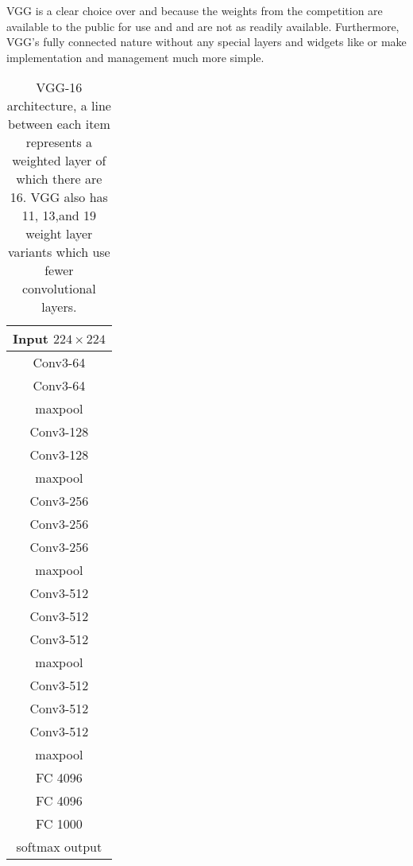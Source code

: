 VGG is a clear choice over \gnet and \anet because the weights from the competition are available to the public for use and \anet and \gnet are not as readily available. Furthermore, VGG's fully connected nature without any special layers and widgets like \anet or \gnet make implementation and management much more simple. %

\begin{table}
    \begin{center}
        \begin{tabular}{| c |}
        \hline
        Input $224 \times 224$ \\
        \hline
        Conv3-64 \\
        Conv3-64 \\
        \hline
        maxpool\\
        \hline
        Conv3-128 \\
        Conv3-128 \\
        \hline
        maxpool \\
        \hline
        Conv3-256 \\
        Conv3-256 \\
        Conv3-256 \\
        \hline
        maxpool \\
        \hline
        Conv3-512 \\
        Conv3-512 \\
        Conv3-512 \\
        \hline
        maxpool \\
        \hline
        Conv3-512 \\
        Conv3-512 \\
        Conv3-512 \\
        \hline
        maxpool\\
        \hline
        FC 4096\\
        \hline
        FC 4096\\
        \hline
        FC 1000\\
        \hline
        softmax output\\
        \hline
        \end{tabular}
        \caption{VGG-16 architecture, a line between each item represents a weighted layer of which there are 16. VGG also has 11, 13,and 19 weight layer variants which use fewer convolutional layers.}
    \end{center}
\end{table}

